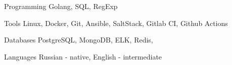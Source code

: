 
\begin{cvskills}

  \cvskill
    {Programming} %
    {Golang, SQL, RegExp} %

  \cvskill
    {Tools} %
    {Linux, Docker, Git, Ansible, SaltStack, Gitlab CI, Github Actions} %


  \cvskill
    {Databases} %
    {PostgreSQL, MongoDB, ELK, Redis,} %

  \cvskill
    {Languages} %
    {Russian - native, English - intermediate } %

\end{cvskills}
